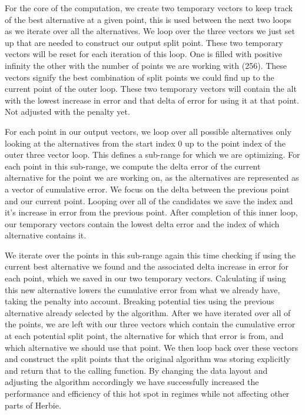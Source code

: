 \documentclass{article}
\begin{document}
For the core of the computation, we create two temporary vectors to keep track of the best alternative at a given point, this is used between the next two loops as we iterate over all the alternatives. We loop over the three vectors we just set up that are needed to construct our output split point. These two temporary vectors will be reset for each iteration of this loop. One is filled with positive infinity the other with the number of points we are working with (256). These vectors signify the best combination of split points we could find up to the current point of the outer loop. These two temporary vectors will contain the alt with the lowest increase in error and that delta of error for using it at that point. Not adjusted with the penalty yet.

For each point in our output vectors, we loop over all possible alternatives only looking at the alternatives from the start index 0 up to the point index of the outer three vector loop. This defines a sub-range for which we are optimizing. For each point in this sub-range, we compute the delta error of the current alternative for the point we are working on, as the alternatives are represented as a vector of cumulative error. We focus on the delta between the previous point and our current point. Looping over all of the candidates we save the index and it's increase in error from the previous point. After completion of this inner loop, our temporary vectors contain the lowest delta error and the index of which alternative contains it.

We iterate over the points in this sub-range again this time checking if using the current best alternative we found and the associated delta increase in error for each point, which we saved in our two temporary vectors. Calculating if using this new alternative lowers the cumulative error from what we already have, taking the penalty into account. Breaking potential ties using the previous alternative already selected by the algorithm. After we have iterated over all of the points, we are left with our three vectors which contain the cumulative error at each potential split point, the alternative for which that error is from, and which alternative we should use that point. We then loop back over these vectors and construct the split points that the original algorithm was storing explicitly and return that to the calling function. By changing the data layout and adjusting the algorithm accordingly we have successfully increased the performance and efficiency of this hot spot in regimes while not affecting other parts of Herbie.
\end{document}
